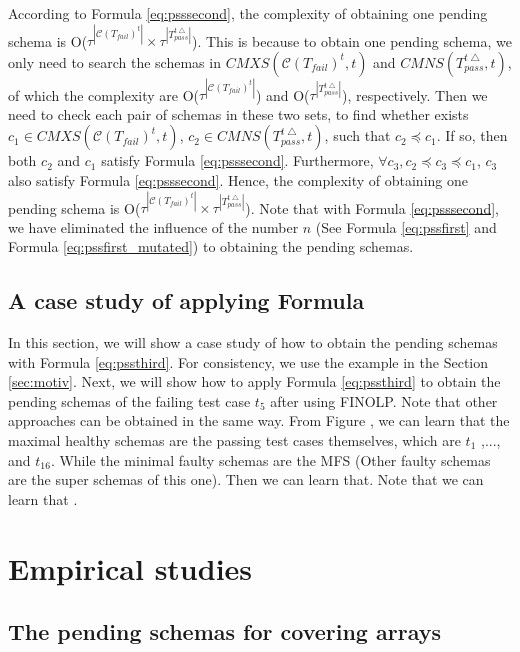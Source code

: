 {According to Formula \ref{eq:psssecond}, the complexity of obtaining one pending schema is O($ \tau^{|\mathcal{C}(T_{fail})^{t}|} \times \tau^{|T_{pass}^{t\bigtriangleup}|}$). This is because to obtain one pending schema, we only need to search the schemas in $CMXS(\mathcal{C}(T_{fail})^{t}, t)$ and $CMNS(T_{pass}^{t\bigtriangleup}, t)$, of which the complexity are O($\tau^{|\mathcal{C}(T_{fail})^{t}|}$) and O($\tau^{|T_{pass}^{t\bigtriangleup}|}$), respectively. Then we need to check each pair of schemas in these two sets, to find whether exists $c_{1} \in CMXS(\mathcal{C}(T_{fail})^{t}, t)$, $c_{2} \in CMNS(T_{pass}^{t\bigtriangleup}, t)$, such that $c_{2} \preceq c_{1}$. If so, then both $c_{2}$ and $c_{1}$ satisfy Formula \ref{eq:psssecond}. Furthermore, $\forall c_{3}, c_{2} \preceq c_{3} \preceq c_{1}$, $c_{3}$ also satisfy Formula \ref{eq:psssecond}. Hence, the complexity of obtaining one pending schema is O($\tau^{|\mathcal{C}(T_{fail})^{t}|} \times \tau^{|T_{pass}^{t\bigtriangleup}|}$). Note that with Formula \ref{eq:psssecond}, we have eliminated the influence of the number $n$ (See Formula \ref{eq:pssfirst} and Formula \ref{eq:pssfirst_mutated}) to obtaining the pending schemas.

\subsection{A case study of applying Formula }
In this section, we will show a case study of how to obtain the pending schemas with Formula \ref{eq:pssthird}. For consistency, we use the example in the Section \ref{sec:motiv}. Next, we will show how to  apply Formula \ref{eq:pssthird} to obtain the pending schemas of the failing test case $t_{5}$ after using FINOLP. Note that other approaches can be obtained in the same way.
From Figure , we can learn that the maximal healthy schemas are the passing test cases themselves, which are $t_{1}$ ,..., and $t_{16}$. While the minimal faulty schemas are the MFS  (Other faulty schemas are the super schemas of this one).
Then we can learn that.  Note that we can learn that .



\section{Empirical studies}\label{sec:emp}


\subsection{The pending schemas for covering arrays}

}
